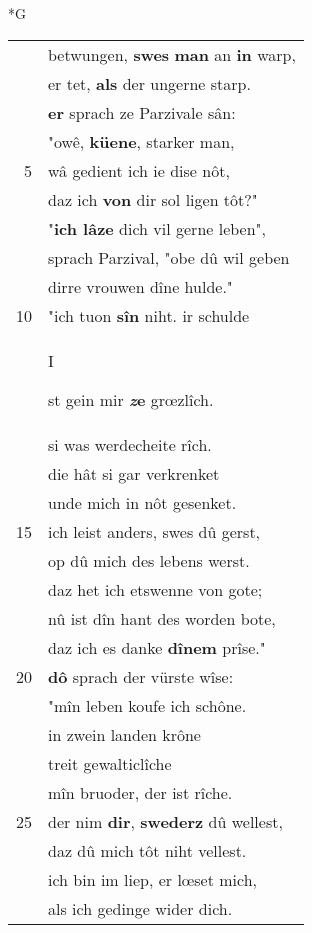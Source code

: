 \documentclass[8pt,a4paper,notitlepage]{article}
\begin{document}
\begin{table}[ht]
\begin{minipage}[t]{0.5\linewidth}
\small
\begin{center}*G
\end{center}
\begin{tabular}{rl}
 & betwungen, \textbf{swes} \textbf{man} an \textbf{in} warp,\\ 
 & er tet, \textbf{als} der ungerne starp.\\ 
 & \textbf{er} sprach ze Parzivale sân:\\ 
 & "owê, \textbf{küene}, starker man,\\ 
5 & wâ gedient ich ie dise nôt,\\ 
 & daz ich \textbf{von} dir sol ligen tôt?"\\ 
 & "\textbf{ich lâze} dich vil gerne leben",\\ 
 & sprach Parzival, "obe dû wil geben\\ 
 & dirre vrouwen dîne hulde."\\ 
10 & "ich tuon \textbf{sîn} niht. ir schulde\\ 
 & \begin{large}I\end{large}st gein mir \textbf{\textit{z}e} grœzlîch.\\ 
 & si was werdecheite rîch.\\ 
 & die hât si gar verkrenket\\ 
 & unde mich in nôt gesenket.\\ 
15 & ich leist anders, swes dû gerst,\\ 
 & op dû mich des lebens werst.\\ 
 & daz het ich etswenne von gote;\\ 
 & nû ist dîn hant des worden bote,\\ 
 & daz ich es danke \textbf{dînem} prîse."\\ 
20 & \textbf{dô} sprach der vürste wîse:\\ 
 & "mîn leben koufe ich schône.\\ 
 & in zwein landen krône\\ 
 & treit gewalticlîche\\ 
 & mîn bruoder, der ist rîche.\\ 
25 & der nim \textbf{dir}, \textbf{swederz} dû wellest,\\ 
 & daz dû mich tôt niht vellest.\\ 
 & ich bin im liep, er lœset mich,\\ 
 & als ich gedinge wider dich.\\ 

\end{tabular}
\end{minipage}
\end{table}
\end{document}
